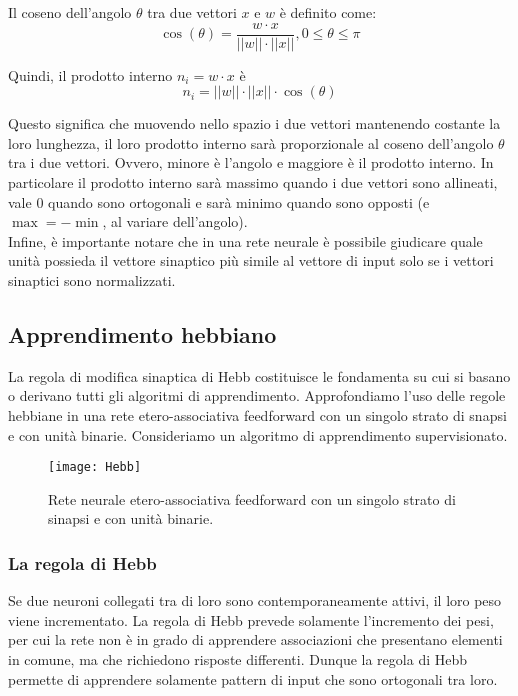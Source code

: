 Il coseno dell'angolo $\theta$ tra due vettori $x$ e $w$ è definito come:
\begin{equation*}
	\cos(\theta) = \frac{w \cdot x}{||w|| \cdot ||x||}, 0 \leq \theta \leq \pi
\end{equation*}

Quindi, il prodotto interno $n_i = w \cdot x$ è
\begin{equation*}
	n_i = ||w|| \cdot ||x|| \cdot \cos(\theta)
\end{equation*}

Questo significa che muovendo nello spazio i due vettori mantenendo costante la
loro lunghezza, il loro prodotto interno sarà proporzionale al coseno
dell'angolo $\theta$ tra i due vettori. Ovvero, minore è l'angolo e maggiore è
il prodotto interno. In particolare il prodotto interno sarà massimo quando i
due vettori sono allineati, vale 0 quando sono ortogonali e sarà minimo quando
sono opposti (e $\max = -\min$, al variare dell'angolo).\\
Infine, è importante notare che in una rete neurale è possibile giudicare quale
unità possieda il vettore sinaptico più simile al vettore di input solo se i
vettori sinaptici sono normalizzati.

\subsection{Apprendimento hebbiano}

La regola di modifica sinaptica di Hebb costituisce le fondamenta su cui si
basano o derivano tutti gli algoritmi di apprendimento. Approfondiamo l'uso
delle regole hebbiane in una rete etero-associativa feedforward con un singolo
strato di snapsi e con unità binarie. Consideriamo un algoritmo di apprendimento
supervisionato.

\begin{figure}[H]
	\centering
	\texttt{[image: Hebb]}
	\caption{Rete neurale etero-associativa feedforward con un singolo strato di
		sinapsi e con unità binarie.}
\end{figure}

\subsubsection{La regola di Hebb}

Se due neuroni collegati tra di loro sono contemporaneamente attivi, il loro
peso viene incrementato. La regola di Hebb prevede solamente l'incremento dei
pesi, per cui la rete non è in grado di apprendere associazioni che presentano
elementi in comune, ma che richiedono risposte differenti. Dunque la regola di
Hebb permette di apprendere solamente pattern di input che sono ortogonali tra
loro.

